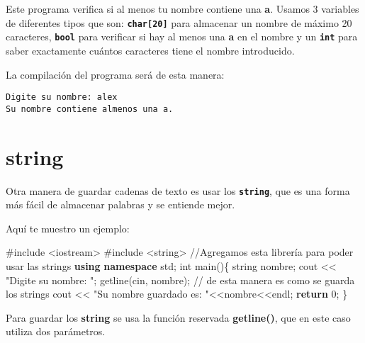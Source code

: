 \documentclass[
  11pt,
  a4paper,
  DIV=11,
  numbers=noendperiod]{scrreprt}
\newenvironment{Shaded}{\begin{snugshade}}{\end{snugshade}}
\newcommand{\CommentTok}[1]{\textcolor[rgb]{0.37,0.37,0.37}{#1}}
\newcommand{\ControlFlowTok}[1]{\textcolor[rgb]{0.00,0.23,0.31}{\textbf{#1}}}
\newcommand{\DataTypeTok}[1]{\textcolor[rgb]{0.68,0.00,0.00}{#1}}
\newcommand{\DecValTok}[1]{\textcolor[rgb]{0.68,0.00,0.00}{#1}}
\newcommand{\ImportTok}[1]{\textcolor[rgb]{0.00,0.46,0.62}{#1}}
\newcommand{\KeywordTok}[1]{\textcolor[rgb]{0.00,0.23,0.31}{\textbf{#1}}}
\newcommand{\NormalTok}[1]{\textcolor[rgb]{0.00,0.23,0.31}{#1}}
\newcommand{\OperatorTok}[1]{\textcolor[rgb]{0.37,0.37,0.37}{#1}}
\newcommand{\PreprocessorTok}[1]{\textcolor[rgb]{0.68,0.00,0.00}{#1}}
\newcommand{\StringTok}[1]{\textcolor[rgb]{0.13,0.47,0.30}{#1}}
\begin{document}
Este programa verifica si al menos tu nombre contiene una \textbf{a}.
Usamos 3 variables de diferentes tipos que son:
\textbf{\texttt{char{[}20{]}}} para almacenar un nombre de máximo 20
caracteres, \textbf{\texttt{bool}} para verificar si hay al menos una
\textbf{a} en el nombre y un \textbf{\texttt{int}} para saber
exactamente cuántos caracteres tiene el nombre introducido.

La compilación del programa será de esta manera:

\begin{tcolorbox}[custombox]
\begin{verbatim}
Digite su nombre: alex
Su nombre contiene almenos una a.
\end{verbatim}
\end{tcolorbox}

\section{string}\label{string}

Otra manera de guardar cadenas de texto es usar los
\textbf{\texttt{string}}, que es una forma más fácil de almacenar
palabras y se entiende mejor.

Aquí te muestro un ejemplo:

\begin{Shaded}
\begin{Highlighting}[]
\PreprocessorTok{\#include }\ImportTok{\textless{}iostream\textgreater{}}
\PreprocessorTok{\#include }\ImportTok{\textless{}string\textgreater{}}\PreprocessorTok{  }\CommentTok{//Agregamos esta librería para poder usar las strings}
\KeywordTok{using} \KeywordTok{namespace}\NormalTok{ std}\OperatorTok{;}
\DataTypeTok{int}\NormalTok{ main}\OperatorTok{()\{}
\NormalTok{    string nombre}\OperatorTok{;}
\NormalTok{    cout }\OperatorTok{\textless{}\textless{}} \StringTok{"Digite su nombre: "}\OperatorTok{;}
\NormalTok{    getline}\OperatorTok{(}\NormalTok{cin}\OperatorTok{,}\NormalTok{ nombre}\OperatorTok{);} \CommentTok{// de esta manera es como se guarda los strings}
\NormalTok{    cout }\OperatorTok{\textless{}\textless{}} \StringTok{"Su nombre guardado es: "}\OperatorTok{\textless{}\textless{}}\NormalTok{nombre}\OperatorTok{\textless{}\textless{}}\NormalTok{endl}\OperatorTok{;}
    \ControlFlowTok{return} \DecValTok{0}\OperatorTok{;}
\OperatorTok{\}}
\end{Highlighting}
\end{Shaded}

Para guardar los \textbf{string} se usa la función reservada
\textbf{getline()}, que en este caso utiliza dos parámetros.
\end{document}
